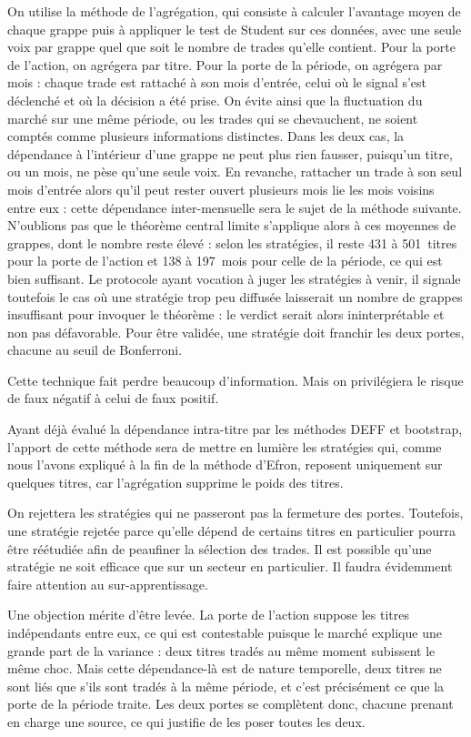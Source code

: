 On utilise la méthode de l'agrégation, qui consiste à calculer l'avantage moyen
de chaque grappe puis à appliquer le test de Student sur ces données, avec une
seule voix par grappe quel que soit le nombre de trades qu'elle contient.
Pour la porte de l'action, on agrégera par titre. Pour la porte de la période,
on agrégera par mois : chaque trade est rattaché à son mois d'entrée, celui où
le signal s'est déclenché et où la décision a été prise. On évite ainsi que la
fluctuation du marché sur une même période, ou les trades qui se chevauchent,
ne soient comptés comme plusieurs informations distinctes.
Dans les deux cas, la dépendance à l'intérieur d'une grappe ne peut plus rien
fausser, puisqu'un titre, ou un mois, ne pèse qu'une seule voix. En revanche,
rattacher un trade à son seul mois d'entrée alors qu'il peut rester ouvert
plusieurs mois lie les mois voisins entre eux : cette dépendance inter-mensuelle
sera le sujet de la méthode suivante.
N'oublions pas que le théorème central limite s'applique alors à ces moyennes
de grappes, dont le nombre reste élevé : selon les stratégies, il reste 431 à
501~titres pour la porte de l'action et 138 à 197~mois pour celle de la période,
ce qui est bien suffisant. Le protocole ayant vocation à juger les stratégies à
venir, il signale toutefois le cas où une stratégie trop peu diffusée
laisserait un nombre de grappes insuffisant pour invoquer le théorème : le
verdict serait alors ininterprétable et non pas défavorable. Pour être validée,
une stratégie doit franchir les deux portes, chacune au seuil de Bonferroni.

Cette technique fait perdre beaucoup d'information. Mais on privilégiera
le risque de faux négatif à celui de faux positif.

Ayant déjà évalué la dépendance intra-titre par les méthodes DEFF et bootstrap,
l'apport de cette méthode sera de mettre en lumière les stratégies qui, comme
nous l'avons expliqué à la fin de la méthode d'Efron, reposent uniquement sur
quelques titres, car l'agrégation supprime le poids des titres.

On rejettera les stratégies qui ne passeront pas la fermeture des portes.
Toutefois, une stratégie rejetée parce qu'elle dépend de certains titres en
particulier pourra être réétudiée afin de peaufiner la sélection des trades.
Il est possible qu'une stratégie ne soit efficace que sur un secteur en
particulier. Il faudra évidemment faire attention au sur-apprentissage.

Une objection mérite d'être levée. La porte de l'action suppose les titres
indépendants entre eux, ce qui est contestable puisque le marché explique une
grande part de la variance : deux titres tradés au même moment subissent le
même choc. Mais cette dépendance-là est de nature temporelle, deux titres ne
sont liés que s'ils sont tradés à la même période, et c'est précisément ce que
la porte de la période traite. Les deux portes se complètent donc, chacune
prenant en charge une source, ce qui justifie de les poser toutes les deux.

